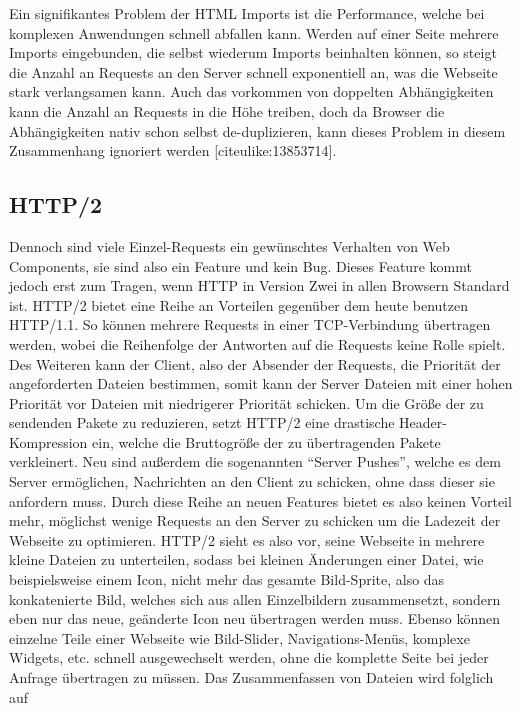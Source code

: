 Ein signifikantes Problem der HTML Imports ist die Performance, welche
bei komplexen Anwendungen schnell abfallen kann. Werden auf einer Seite
mehrere Imports eingebunden, die selbst wiederum Imports beinhalten
können, so steigt die Anzahl an Requests an den Server schnell
exponentiell an, was die Webseite stark verlangsamen kann. Auch das
vorkommen von doppelten Abhängigkeiten kann die Anzahl an Requests in
die Höhe treiben, doch da Browser die Abhängigkeiten nativ schon selbst
de-duplizieren, kann dieses Problem in diesem Zusammenhang ignoriert
werden {[}citeulike:13853714{]}.

\subsection{HTTP/2}\label{http2}

Dennoch sind viele Einzel-Requests ein gewünschtes Verhalten von Web
Components, sie sind also ein Feature und kein Bug. Dieses Feature kommt
jedoch erst zum Tragen, wenn HTTP in Version Zwei in allen Browsern
Standard ist. HTTP/2 bietet eine Reihe an Vorteilen gegenüber dem heute
benutzen HTTP/1.1. So können mehrere Requests in einer TCP-Verbindung
übertragen werden, wobei die Reihenfolge der Antworten auf die Requests
keine Rolle spielt. Des Weiteren kann der Client, also der Absender der
Requests, die Priorität der angeforderten Dateien bestimmen, somit kann
der Server Dateien mit einer hohen Priorität vor Dateien mit niedrigerer
Priorität schicken. Um die Größe der zu sendenden Pakete zu reduzieren,
setzt HTTP/2 eine drastische Header-Kompression ein, welche die
Bruttogröße der zu übertragenden Pakete verkleinert. Neu sind außerdem
die sogenannten ``Server Pushes'', welche es dem Server ermöglichen,
Nachrichten an den Client zu schicken, ohne dass dieser sie anfordern
muss. Durch diese Reihe an neuen Features bietet es also keinen Vorteil
mehr, möglichst wenige Requests an den Server zu schicken um die
Ladezeit der Webseite zu optimieren. HTTP/2 sieht es also vor, seine
Webseite in mehrere kleine Dateien zu unterteilen, sodass bei kleinen
Änderungen einer Datei, wie beispielsweise einem Icon, nicht mehr das
gesamte Bild-Sprite, also das konkatenierte Bild, welches sich aus allen
Einzelbildern zusammensetzt, sondern eben nur das neue, geänderte Icon
neu übertragen werden muss. Ebenso können einzelne Teile einer Webseite
wie Bild-Slider, Navigations-Menüs, komplexe Widgets, etc. schnell
ausgewechselt werden, ohne die komplette Seite bei jeder Anfrage
übertragen zu müssen. Das Zusammenfassen von Dateien wird folglich auf
